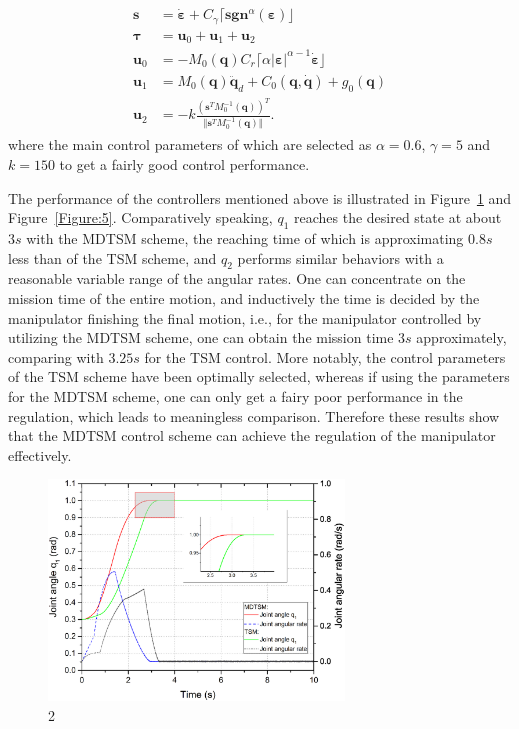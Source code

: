 \documentclass[3p]{elsarticle}
\theoremstyle{plain}
\theoremstyle{remark}
\begin{document}
\begin{align}
\begin{split}
\bm s &= \dot{\bm \varepsilon}+C_\gamma\lceil\bm{sgn}^\alpha(\bm \varepsilon)\rfloor\\
\bm\tau &= \bm u_0+\bm u_1 +\bm u_2\\
\bm u_0 &= -M_0(\bm q)C_r\lceil\alpha\vert\bm\varepsilon\vert^{\alpha-1}\dot{\bm \varepsilon}\rfloor\\
\bm u_1 &= M_0(\bm q)\ddot {\bm q}_d+C_0(\bm q,\dot {\bm q})+g_0(\bm q)\\
\bm u_2 &= -k\frac{(\bm s^TM_0^{-1}(\bm q))^T}{\Vert\bm s^TM_0^{-1}(\bm q)\Vert}.
\end{split}
\end{align}
where the main control parameters of which are selected as $\alpha = 0.6$, $\gamma = 5$ and $k = 150$ to get a fairly good control performance.\par
The performance of the controllers mentioned above is illustrated in Figure~\ref{Figure:4} and Figure~\ref{Figure:5}. Comparatively speaking, $q_1$ reaches the desired state at about $3s$ with the MDTSM scheme, the reaching time of which is approximating $0.8s$ less than of the TSM scheme, and $q_2$ performs similar behaviors with a reasonable variable range of the angular rates. One can concentrate on the mission time of the entire motion, and inductively the time is decided by the manipulator finishing the final motion, i.e., for the manipulator controlled by utilizing the MDTSM scheme, one can obtain the mission time $3s$ approximately, comparing with $3.25s$ for the TSM control. More notably, the control parameters of the TSM scheme have been optimally selected, whereas if using the parameters for the MDTSM scheme, one can only get a fairy poor performance in the regulation, which leads to meaningless comparison. Therefore these results show that the MDTSM control scheme can achieve the regulation of the manipulator effectively.
\begin{figure}
\centering
\includegraphics[width=0.7\textwidth]{paper3_fig4.eps}
\caption{2}
\label{Figure:4}
\end{figure}
\end{document}
